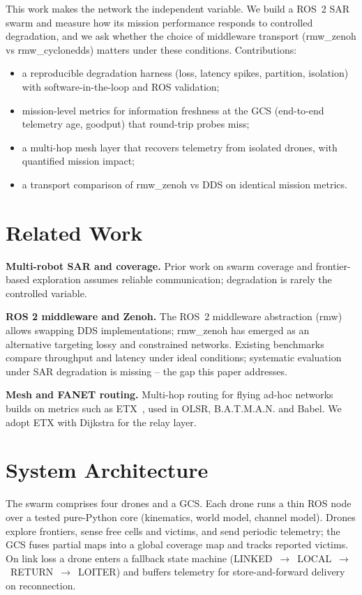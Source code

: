 \documentclass[conference]{IEEEtran}
\begin{document}
This work makes the network the independent variable. We build a ROS~2 SAR
swarm and measure how its mission performance responds to controlled
degradation, and we ask whether the choice of middleware transport
(rmw\_zenoh vs rmw\_cyclonedds) matters under these conditions. Contributions:
\begin{itemize}
\item a reproducible degradation harness (loss, latency spikes, partition,
isolation) with software-in-the-loop and ROS validation;
\item mission-level metrics for information freshness at the GCS (end-to-end
telemetry age, goodput) that round-trip probes miss;
\item a multi-hop mesh layer that recovers telemetry from isolated drones, with
quantified mission impact;
\item a transport comparison of rmw\_zenoh vs DDS on identical mission metrics.
\end{itemize}

\section{Related Work}
\textbf{Multi-robot SAR and coverage.} Prior work on swarm coverage and
frontier-based exploration assumes reliable communication; degradation is rarely
the controlled variable.

\textbf{ROS 2 middleware and Zenoh.} The ROS~2 middleware abstraction (rmw)
allows swapping DDS implementations; rmw\_zenoh has emerged as an alternative
targeting lossy and constrained networks. Existing benchmarks compare
throughput and latency under ideal conditions; systematic evaluation under SAR
degradation is missing -- the gap this paper addresses.

\textbf{Mesh and FANET routing.} Multi-hop routing for flying ad-hoc networks
builds on metrics such as ETX~\cite{decouto2004}, used in OLSR, B.A.T.M.A.N. and
Babel. We adopt ETX with Dijkstra for the relay layer.

\section{System Architecture}
The swarm comprises four drones and a GCS. Each drone runs a thin ROS node over
a tested pure-Python core (kinematics, world model, channel model). Drones
explore frontiers, sense free cells and victims, and send periodic telemetry;
the GCS fuses partial maps into a global coverage map and tracks reported
victims. On link loss a drone enters a fallback state machine
(LINKED~$\rightarrow$~LOCAL~$\rightarrow$~RETURN~$\rightarrow$~LOITER) and buffers
telemetry for store-and-forward delivery on reconnection.
\end{document}
